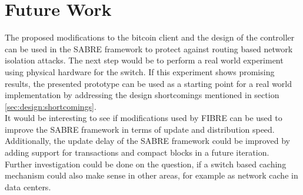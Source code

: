 \chapter{\label{outlook}Future Work}
The proposed modifications to the bitcoin client and the design of the controller can be used in the SABRE framework to protect against routing based network isolation attacks. The next step would be to perform a real world experiment using physical hardware for the switch. If this experiment shows promising results, the presented prototype can be used as a starting point for a real world implementation by addressing the design shortcomings mentioned in section \ref{sec:design:shortcomings}.\\
It would be interesting to see if modifications used by FIBRE can be used to improve the SABRE framework in terms of update and distribution speed. Additionally, the update delay of the SABRE framework could be improved by adding support for transactions and compact blocks in a future iteration.\\
Further investigation could be done on the question, if a switch based caching mechanism could also make sense in other areas, for example as network cache in data centers.